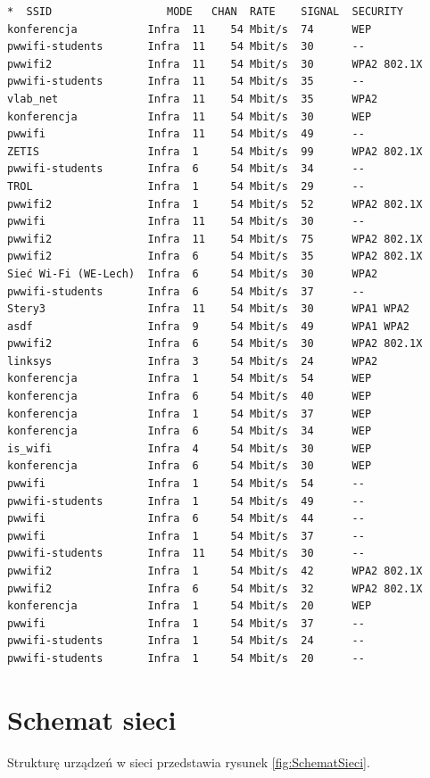 \documentclass{mwart} %
\begin{document}
\begin{verbatim}
*  SSID                  MODE   CHAN  RATE    SIGNAL  SECURITY
konferencja           Infra  11    54 Mbit/s  74      WEP
pwwifi-students       Infra  11    54 Mbit/s  30      --
pwwifi2               Infra  11    54 Mbit/s  30      WPA2 802.1X
pwwifi-students       Infra  11    54 Mbit/s  35      --
vlab_net              Infra  11    54 Mbit/s  35      WPA2
konferencja           Infra  11    54 Mbit/s  30      WEP
pwwifi                Infra  11    54 Mbit/s  49      --
ZETIS                 Infra  1     54 Mbit/s  99      WPA2 802.1X
pwwifi-students       Infra  6     54 Mbit/s  34      --
TROL                  Infra  1     54 Mbit/s  29      --
pwwifi2               Infra  1     54 Mbit/s  52      WPA2 802.1X
pwwifi                Infra  11    54 Mbit/s  30      --
pwwifi2               Infra  11    54 Mbit/s  75      WPA2 802.1X
pwwifi2               Infra  6     54 Mbit/s  35      WPA2 802.1X
Sieć Wi-Fi (WE-Lech)  Infra  6     54 Mbit/s  30      WPA2
pwwifi-students       Infra  6     54 Mbit/s  37      --
Stery3                Infra  11    54 Mbit/s  30      WPA1 WPA2
asdf                  Infra  9     54 Mbit/s  49      WPA1 WPA2
pwwifi2               Infra  6     54 Mbit/s  30      WPA2 802.1X
linksys               Infra  3     54 Mbit/s  24      WPA2
konferencja           Infra  1     54 Mbit/s  54      WEP
konferencja           Infra  6     54 Mbit/s  40      WEP
konferencja           Infra  1     54 Mbit/s  37      WEP
konferencja           Infra  6     54 Mbit/s  34      WEP
is_wifi               Infra  4     54 Mbit/s  30      WEP
konferencja           Infra  6     54 Mbit/s  30      WEP
pwwifi                Infra  1     54 Mbit/s  54      --
pwwifi-students       Infra  1     54 Mbit/s  49      --
pwwifi                Infra  6     54 Mbit/s  44      --
pwwifi                Infra  1     54 Mbit/s  37      --
pwwifi-students       Infra  11    54 Mbit/s  30      --
pwwifi2               Infra  1     54 Mbit/s  42      WPA2 802.1X
pwwifi2               Infra  6     54 Mbit/s  32      WPA2 802.1X
konferencja           Infra  1     54 Mbit/s  20      WEP
pwwifi                Infra  1     54 Mbit/s  37      --
pwwifi-students       Infra  1     54 Mbit/s  24      --
pwwifi-students       Infra  1     54 Mbit/s  20      --
\end{verbatim}

\section{Schemat sieci}
Strukturę urządzeń w sieci przedstawia rysunek \ref{fig:SchematSieci}.
\end{document}
